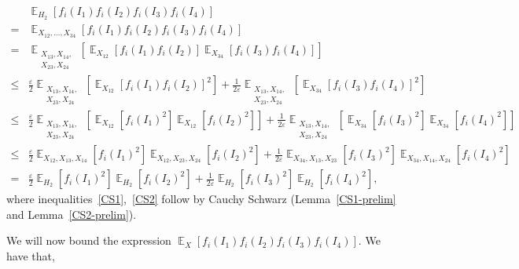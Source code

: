 \documentclass[11pt]{article}
\DeclareMathOperator*{\E}{\mathbb{E}}
\def \T {\widetilde{\E}}
\def \eps {{\varepsilon}}
\theoremstyle{definition}
\begin{document}
\begin{align}
&\E_{H_2}[ f_i(I_1) f_i(I_2) f_i(I_3) f_i(I_4)] \nonumber\\
= &\E_{X_{12},\ldots,X_{34}}[f_i(I_1) f_i(I_2) f_i(I_3) f_i(I_4)] \nonumber\\
= &\E_{\substack{X_{13},X_{14},\\ X_{23},X_{24}}}[\E_{X_{12}}[f_i(I_1) f_i(I_2)]\E_{X_{34}}[f_i(I_3) f_i(I_4)] ] \nonumber\\
\leq &\frac{\eps}{2}\E_{\substack{X_{13},X_{14},\\ X_{23},X_{24}}}[\E_{X_{12}}[f_i(I_1) f_i(I_2)]^2] +  \frac{1}{2\eps}\E_{\substack{X_{13},X_{14},\\ X_{23},X_{24}}}[\E_{X_{34}}[f_i(I_3) f_i(I_4)]^2] \label{CS1} \\
\leq &\frac{\eps}{2}\E_{\substack{X_{13},X_{14},\\ X_{23},X_{24}}}[\E_{X_{12}}[f_i(I_1)^2]\E_{X_{12}}[f_i(I_2)^2]] +  \frac{1}{2\eps}\E_{\substack{X_{13},X_{14},\\ X_{23},X_{24}}}[\E_{X_{34}}[f_i(I_3)^2]\E_{X_{34}}[f_i(I_4)^2]]\label{CS2} \\
\leq &\frac{\eps}{2}\E_{X_{12},X_{13},X_{14}}[f_i(I_1)^2]\E_{X_{12},X_{23},X_{24}}[f_i(I_2)^2] +  \frac{1}{2\eps}\E_{X_{34},X_{13},X_{23}}[f_i(I_3)^2]\E_{X_{34},X_{14},X_{24}}[f_i(I_4)^2] \nonumber \\
= &\frac{\eps}{2}\E_{H_2}[f_i(I_1)^2]\E_{H_2}[f_i(I_2)^2] +  \frac{1}{2\eps}\E_{H_2}[f_i(I_3)^2]\E_{H_2}[f_i(I_4)^2],\label{last-eq} 
\end{align}
where inequalities~\eqref{CS1},~\eqref{CS2} follow by Cauchy Schwarz (Lemma~\ref{CS1-prelim} and Lemma~\ref{CS2-prelim}). 


\bigskip


We will now bound the expression $\E_X[f_i(I_1)f_i(I_2)f_i(I_3)f_i(I_4)]$. We have that,
\end{document}
